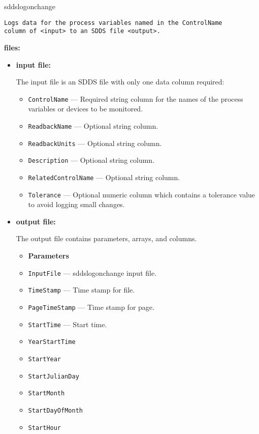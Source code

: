 \begin{sddsprog}{sddslogonchange}
\begin{verbatim}
Logs data for the process variables named in the ControlName
column of <input> to an SDDS file <output>.
\end{verbatim}
\item \textbf{files:}
\begin{itemize}
\item \textbf{input file:}\par
The input file is an SDDS file with only one data column required:
\begin{itemize}
        \item {\tt ControlName} --- Required string column for the names of the process variables or devices to be monitored.
        \item {\tt ReadbackName} --- Optional string column.
        \item {\tt ReadbackUnits} --- Optional string column.
        \item {\tt Description} --- Optional string column.
        \item {\tt RelatedControlName} --- Optional string column.
        \item {\tt Tolerance} --- Optional numeric column which contains a tolerance value to avoid logging small changes.
\end{itemize}

\item \textbf{output file:}\par
The output file contains parameters, arrays, and columns.
\begin{itemize}
        \item {\bf Parameters}
        \item {\tt InputFile} --- sddslogonchange input file.
        \item {\tt TimeStamp} --- Time stamp for file.
        \item {\tt PageTimeStamp} --- Time stamp for page.
        \item {\tt StartTime} --- Start time.
        \item {\tt YearStartTime}
        \item {\tt StartYear}
        \item {\tt StartJulianDay}
        \item {\tt StartMonth}
        \item {\tt StartDayOfMonth}
        \item {\tt StartHour}
\end{itemize}
\begin{verbatim}


\end{verbatim}
\end{itemize}
\end{sddsprog}
